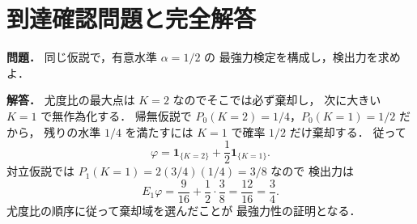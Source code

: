 \documentclass[a5paper,10pt,onecolumn]{jsarticle}
\theoremstyle{mathnotetheorem}
\begin{document}
\section*{到達確認問題と完全解答}
\noindent\textbf{問題．}
同じ仮説で，有意水準 $\alpha=1/2$ の
最強力検定を構成し，検出力を求めよ．

\medskip\noindent\textbf{解答．}
尤度比の最大点は $K=2$ なのでそこでは必ず棄却し，
次に大きい $K=1$ で無作為化する．
帰無仮説で
$P_0(K=2)=1/4$，$P_0(K=1)=1/2$ だから，
残りの水準 $1/4$ を満たすには
$K=1$ で確率 $1/2$ だけ棄却する．
従って
\[
 \varphi=\mathbf1_{\{K=2\}}+
         \frac12\mathbf1_{\{K=1\}}.
\]
対立仮説では $P_1(K=1)=2(3/4)(1/4)=3/8$ なので
検出力は
\[
 E_1\varphi=\frac9{16}+\frac12\cdot\frac38
 =\frac{12}{16}=\frac34.
\]
尤度比の順序に従って棄却域を選んだことが
最強力性の証明となる．
\end{document}
